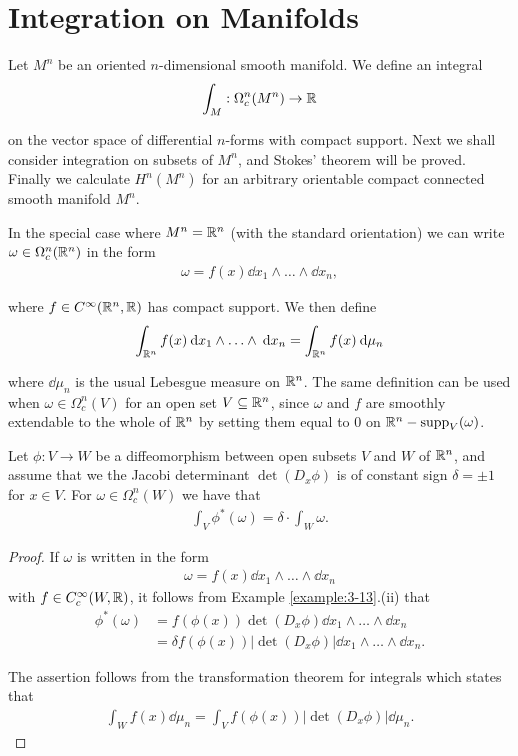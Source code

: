 \chapter{Integration on Manifolds}
Let $M^n$ be an oriented $n$-dimensional smooth manifold. We define an integral
\begin{align*}
  \int_M: \Omega^n_c(M^n)\to {\ensuremath{\mathbb{R}}}
\end{align*}

on the vector space of differential $n$-forms with compact support. Next we shall
consider integration on subsets of $M^n$, and Stokes' theorem will be proved.
Finally we calculate $H^n (M^n)$ for an arbitrary orientable compact connected
smooth manifold $M^n$.

In the special case where $M^n = {\mathbb{R}}^n$ (with the standard orientation) we can write
$\omega\in\Omega^n_c({\mathbb{R}}^n)$ in the form 
\begin{align*}
  \omega = f(x)\dd x_1\wedge\ldots\wedge\dd x_n,
\end{align*}

where $f\in C^\infty({\mathbb{R}}^n, {\mathbb{R}})$ has compact support. We then define 
\begin{align*}
  \int_{\RR^n}^{}{f(x)\dd x_1\wedge\ldots\wedge\dd x_n }
  = \int_{\RR^n} f(x)\dd \mu_n
\end{align*}

where $\dd\mu_n$ is the usual Lebesgue measure on ${\mathbb{R}}^n$. The same definition can be used
when $\omega\in\Omega^n_c(V)$ for an open set $V\subseteq{\ensuremath{\mathbb{R}}}^n$, since $\omega$ and $f$ are smoothly 
extendable to the whole of ${\mathbb{R}}^n$ by setting them equal to 0 on ${\mathbb{R}}^n-\mathrm{supp}_V(\omega)$.


\begin{lemma}\label{lemma:10-1}
  Let $\phi:V\to W$ be a diffeomorphism between open subsets $V$ and $W$ of ${\mathbb{R}}^n$, and 
  assume that we the Jacobi determinant $\det (D_x\phi)$ is of constant sign $\delta=\pm 1$
  for $x\in V$. For $\omega\in \Omega^n_c(W)$ we have that 
  \begin{align*}
    \int_V \phi^*(\omega) = \delta\cdot\int_W \omega.
  \end{align*}
\end{lemma}

\begin{proof}
  If $\omega$ is written in the form 
  \begin{align*}
    \omega = f(x)\dd x_1\wedge\ldots\wedge\dd x_n
  \end{align*}
  with $f\in C_c^\infty(W, {\mathbb{R}})$, it follows from Example \ref{example:3-13}.(ii) that
  \begin{align*}
    \phi^*(\omega)
    & = f(\phi(x))\det(D_x\phi)\dd x_1\wedge\ldots\wedge\dd x_n\\ 
    & = \delta f(\phi(x))|\det(D_x\phi)|\dd x_1\wedge\ldots\wedge\dd x_n.
  \end{align*}

  The assertion follows from the transformation theorem for integrals which states that
  \begin{align*}
    \int_W f(x)\dd\mu_n 
    = \int_V f(\phi(x))|\det(D_x\phi)|\dd\mu_n.
  \end{align*}
\end{proof}

